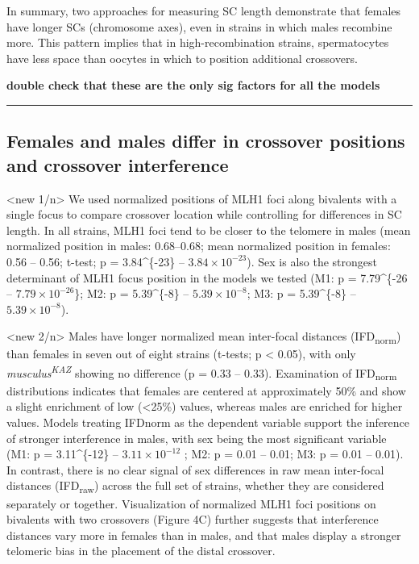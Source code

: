 \documentclass[
]{article}
\begin{document}
In summary, two approaches for measuring SC length demonstrate that
females have longer SCs (chromosome axes), even in strains in which
males recombine more. This pattern implies that in high-recombination
strains, spermatocytes have less space than oocytes in which to position
additional crossovers.

\textbf{double check that these are the only sig factors for all the
models}

\begin{center}\rule{0.5\linewidth}{0.5pt}\end{center}

\hypertarget{females-and-males-differ-in-crossover-positions-and-crossover-interference}{%
\subsection{Females and males differ in crossover positions and
crossover
interference}\label{females-and-males-differ-in-crossover-positions-and-crossover-interference}}

\textless new 1/n\textgreater{} We used normalized positions of MLH1
foci along bivalents with a single focus to compare crossover location
while controlling for differences in SC length. In all strains, MLH1
foci tend to be closer to the telomere in males (mean normalized
position in males: 0.68--0.68; mean normalized position in females: 0.56
-- 0.56; t-test; p = 3.84\^{}\{-23\} --
\ensuremath{3.84\times 10^{-23}}). Sex is also the strongest determinant
of MLH1 focus position in the models we tested (M1: p = 7.79\^{}\{-26 --
\ensuremath{7.79\times 10^{-26}}\}; M2: p = 5.39\^{}\{-8\} --
\ensuremath{5.39\times 10^{-8}}; M3: p = 5.39\^{}\{-8\} --
\ensuremath{5.39\times 10^{-8}}).

\textless new 2/n\textgreater{} Males have longer normalized mean
inter-focal distances (IFD\textsubscript{norm}) than females in seven
out of eight strains (t-tests; p \textless{} 0.05), with only
\emph{musculus\textsuperscript{KAZ}} showing no difference (p = 0.33 --
0.33). Examination of IFD\textsubscript{norm} distributions indicates
that females are centered at approximately 50\% and show a slight
enrichment of low (\textless25\%) values, whereas males are enriched for
higher values. Models treating IFDnorm as the dependent variable support
the inference of stronger interference in males, with sex being the most
significant variable (M1: p = 3.11\^{}\{-12\} --
\ensuremath{3.11\times 10^{-12}} ; M2: p = 0.01 -- 0.01; M3: p = 0.01 --
0.01). In contrast, there is no clear signal of sex differences in raw
mean inter-focal distances (IFD\textsubscript{raw}) across the full set
of strains, whether they are considered separately or together.
Visualization of normalized MLH1 foci positions on bivalents with two
crossovers (Figure 4C) further suggests that interference distances vary
more in females than in males, and that males display a stronger
telomeric bias in the placement of the distal crossover.
\end{document}
